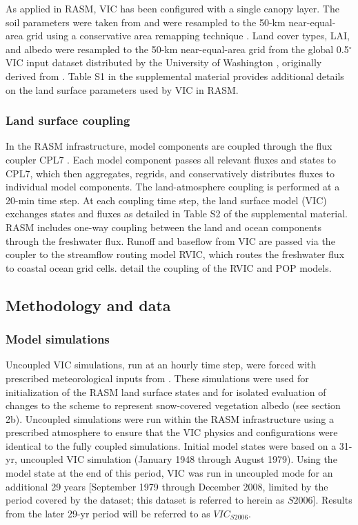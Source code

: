 As applied in RASM, VIC has been configured with a single canopy layer.
The soil parameters were taken from \citet{Sheffield_2006} and were resampled to the 50-km near-equal-area grid using a conservative area remapping technique \citep{Jones_1999}.
Land cover types, LAI, and albedo were resampled to the 50-km near-equal-area grid from the global 0.5$^{\circ}$ VIC input dataset distributed by the University of Washington \citep{Su_2005}, originally derived from \citet{Hansen_2000}.
Table S1 in the supplemental material provides additional details on the land surface parameters used by VIC in RASM.

\subsubsection{Land surface coupling}

In the RASM infrastructure, model components are coupled through the flux coupler CPL7 \citep{Craig_2012}.
Each model component passes all relevant fluxes and states to CPL7, which then aggregates, regrids, and conservatively distributes fluxes to individual model components.
The land-atmosphere coupling is performed at a 20-min time step.
At each coupling time step, the land surface model (VIC) exchanges states and fluxes as detailed in Table S2 of the supplemental material.
RASM includes one-way coupling between the land and ocean components through the freshwater flux.
Runoff and baseflow from VIC are passed via the coupler to the streamflow routing model RVIC, which routes the freshwater flux to coastal ocean grid cells.
\citet{Hamman_2016b} detail the coupling of the RVIC and POP models.

\subsection{Methodology and data}
\label{sec:data_ch3}

\subsubsection{Model simulations}

Uncoupled VIC simulations, run at an hourly time step, were forced with prescribed meteorological inputs from \citet{Sheffield_2006}.
These simulations were used for initialization of the RASM land surface states and for isolated evaluation of changes to the scheme to represent snow-covered vegetation albedo (see section 2b).
Uncoupled simulations were run within the RASM infrastructure using a prescribed atmosphere to ensure that the VIC physics and configurations were identical to the fully coupled simulations.
Initial model states were based on a 31-yr, uncoupled VIC simulation (January 1948 through August 1979).
Using the model state at the end of this period, VIC was run in uncoupled mode for an additional 29 years [September 1979 through December 2008, limited by the period covered by the \citet{Sheffield_2006} dataset; this dataset is referred to herein as $S2006$].
Results from the later 29-yr period will be referred to as $VIC_{S2006}$.

